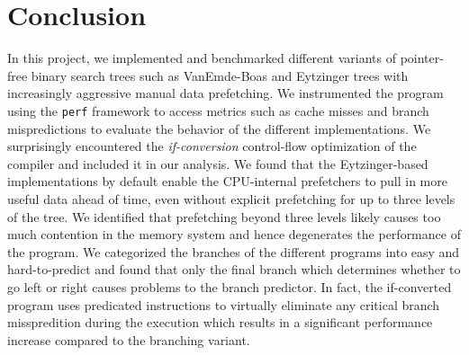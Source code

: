 \documentclass{article}
\begin{document}
\section{Conclusion}
In this project, we implemented and benchmarked different variants of pointer-free binary search trees such as VanEmde-Boas and Eytzinger trees with increasingly aggressive manual data prefetching. We instrumented the program using the \texttt{perf} framework to access metrics such as cache misses and branch mispredictions to evaluate the behavior of the different implementations. We surprisingly encountered the \textit{if-conversion} control-flow optimization of the compiler and included it in our analysis. We found that the Eytzinger-based implementations by default enable the CPU-internal prefetchers to pull in more useful data ahead of time, even without explicit prefetching for up to three levels of the tree. We identified that prefetching beyond three levels likely causes too much contention in the memory system and hence degenerates the performance of the program. We categorized the branches of the different programs into easy and hard-to-predict and found that only the final branch which determines whether to go left or right causes problems to the branch predictor. In fact, the if-converted program uses predicated instructions to virtually eliminate any critical branch misspredition during the execution which results in a significant performance increase compared to the branching variant. 




\newpage
\printbibliography
\end{document}
